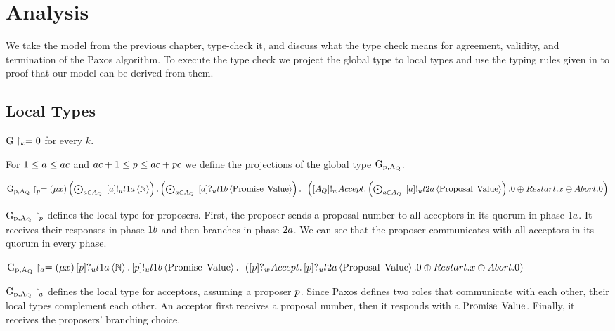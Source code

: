 \chapter{Analysis}
We take the model from the previous chapter, type-check it, and discuss what the type check means for agreement, validity, and termination of the Paxos algorithm.
To execute the type check we project the global type to local types and use the typing rules given in \cite{ftmpst} to proof that our model can be derived from them.

\section{Local Types}
$\operatorname{G} \upharpoonright_{k} = 0$ for every $k$.


For $1 \leq a \leq ac$ and $ac + 1 \leq p \leq ac + pc$ we define the projections of the global type $\operatorname{G_{p, A_Q}}$.

$\operatorname{G_{p, A_Q}} \upharpoonright_{p} = \left(\mu x\right)
\left(\bigodot_{a\in A_Q}\;\left[a\right]!_u l1a \left\langle \mathbb{N} \right\rangle\right) .
\left(\bigodot_{a\in A_Q}\;\left[a\right]?_u l1b \left\langle \operatorname{Promise}\; \operatorname{Value} \right\rangle\right) .\\
\hspace*{0.5em * 1}\left(\left[A_Q\right]!_w \mathnormal{Accept} . \left(\bigodot_{a\in A_Q}\;\left[a\right]!_u l2a \left\langle \operatorname{Proposal}\; \operatorname{Value} \right\rangle\right).0 \oplus \mathnormal{Restart} . x \oplus \mathnormal{Abort} .0\right)$

$\operatorname{G_{p, A_Q}} \upharpoonright_{p}$ defines the local type for proposers.
First, the proposer sends a proposal number to all acceptors in its quorum in phase $1a$.
It receives their responses in phase $1b$ and then branches in phase $2a$.
We can see that the proposer communicates with all acceptors in its quorum in every phase.


$\operatorname{G_{p, A_Q}} \upharpoonright_{a} = \left(\mu x\right)
\left[p\right]?_u l1a \left\langle \mathbb{N} \right\rangle .
\left[p\right]!_u l1b \left\langle \operatorname{Promise}\; \operatorname{Value} \right\rangle .\\
\hspace*{0.5em * 1}\left(\left[p\right]?_w \mathnormal{Accept} . \left[p\right]?_u l2a \left\langle \operatorname{Proposal}\; \operatorname{Value} \right\rangle.0 \oplus \mathnormal{Restart} . x \oplus \mathnormal{Abort} .0\right)$

$\operatorname{G_{p, A_Q}} \upharpoonright_{a}$ defines the local type for acceptors, assuming a proposer $p$.
Since Paxos defines two roles that communicate with each other, their local types complement each other.
An acceptor first receives a proposal number, then it responds with a $\operatorname{Promise}\; \operatorname{Value}$.
Finally, it receives the proposers' branching choice.

